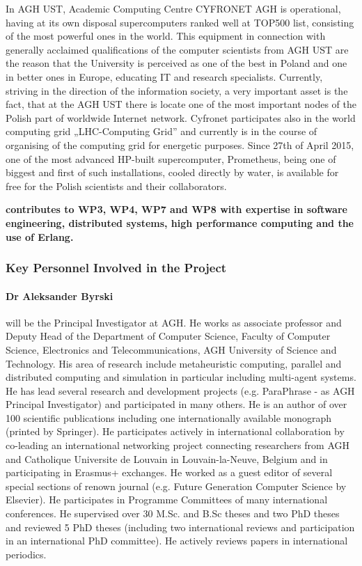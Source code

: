 \documentclass[a4paper,11pt]{article}
\begin{document}
In AGH UST, Academic Computing Centre CYFRONET AGH is operational, having at its own disposal supercomputers ranked well at TOP500 list, consisting of the most powerful ones in the world. This equipment in connection with generally acclaimed qualifications of the computer scientists from AGH UST are the reason that the University is perceived as one of the best in Poland and one in better ones in Europe, educating IT and research specialists. Currently, striving in the direction of the information society, a very important asset is the fact, that at the AGH UST there is locate one of the most important nodes of the Polish part of worldwide Internet network. Cyfronet participates also in the world computing grid „LHC-Computing Grid” and currently is in the course of organising of the computing grid for energetic purposes. Since 27th of April 2015, one of the most advanced HP-built supercomputer, Prometheus, being one of biggest and first of such installations, cooled directly by water, is available for free for the Polish scientists and their collaborators. 

\vspace{10pt}
\textbf{\AGHshort{} contributes to WP3, WP4, WP7 and WP8 with expertise in software engineering, distributed systems, high performance computing and the use of Erlang.}
\vspace{10pt}


\subsubsection*{Key Personnel Involved in the Project}

\paragraph{Dr Aleksander Byrski} will be the Principal Investigator at AGH. He works as associate professor and Deputy Head of the Department of Computer Science, Faculty of Computer Science, Electronics and Telecommunications, AGH University of Science and Technology. His area of research include metaheuristic computing, parallel and distributed computing and simulation in particular including multi-agent systems. He has lead several research and development projects (e.g. ParaPhrase - as AGH Principal Investigator) and participated in many others. He is an author of over 100 scientific publications including one internationally available monograph (printed by Springer). He participates actively in international collaboration by co-leading an international networking project connecting researchers from AGH and Catholique Universite de Louvain in Louvain-la-Neuve, Belgium and in participating in Erasmus+ exchanges. He worked as a guest editor of several special sections of renown journal (e.g. Future Generation Computer Science by Elsevier). He participates in Programme Committees of many international conferences. He supervised over 30 M.Sc. and B.Sc theses and two PhD theses and reviewed 5 PhD theses (including two international reviews and participation in an international PhD committee).  He actively reviews papers in international periodics.
\end{document}
